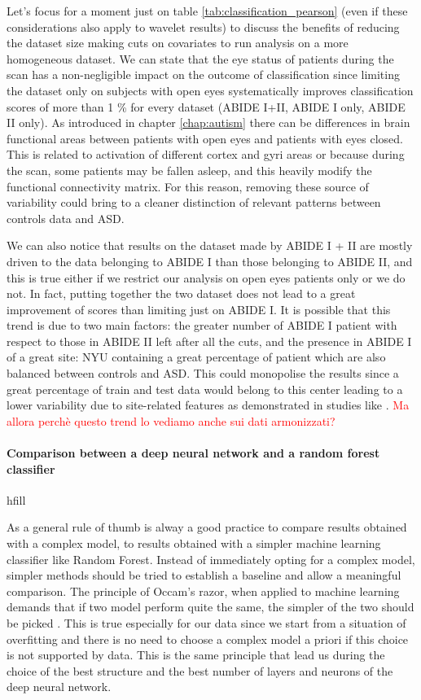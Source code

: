 \documentclass[11pt]{report}
\begin{document}
Let's focus for a moment just on table \ref{tab:classification_pearson} (even if these considerations also apply to wavelet results) to discuss the benefits of reducing the dataset size making cuts on covariates to run analysis on a more homogeneous dataset.
We can state that the eye status of patients during the scan has a non-negligible impact on the outcome of classification since limiting the dataset only on subjects with open eyes systematically improves classification scores of more than 1 \% for every dataset (ABIDE I+II, ABIDE I only, ABIDE II only).
As introduced in chapter \ref{chap:autism} there can be differences in brain functional areas between patients with open eyes and patients with eyes closed.
This is related to activation of different cortex and gyri areas or because during the scan, some patients may be fallen asleep, and this heavily modify the functional connectivity matrix.
For this reason, removing these source of variability could bring to a cleaner distinction of relevant patterns between controls data and ASD.

We can also notice that results on the dataset made by ABIDE I + II are mostly driven to the data belonging to ABIDE I than those belonging to ABIDE II, and this is true either if we restrict our analysis on open eyes patients only or we do not.
In fact, putting together the two dataset does not lead to a great improvement of scores than limiting just on ABIDE I.
It is possible that this trend is due to two main factors: the greater number of ABIDE I patient with respect to those in ABIDE II left after all the cuts, and the presence in ABIDE I of a great site: NYU containing a great percentage of patient which are also balanced between controls and ASD.
This could monopolise the results since a great percentage of train and test data would belong to this center leading to a lower variability due to site-related features as demonstrated in studies like \cite{spera-2019}.
\textcolor{red}{Ma allora perchè questo trend lo vediamo anche sui dati armonizzati?}


\paragraph{Comparison between a deep neural network and a random forest classifier}hfill

As a general rule of thumb is alway a good practice to compare results obtained with a complex model, to results obtained with a simpler machine learning classifier like Random Forest.
Instead of immediately opting for a complex model, simpler methods should be tried to establish a baseline and allow a meaningful comparison.
The principle of Occam's razor, when applied to machine learning demands that if two model perform quite the same, the simpler of the two should be picked \cite{domingos-1999}.
This is true especially for our data since we start from a situation of overfitting and there is no need to choose a complex model a priori if this choice is not supported by data.
This is the same principle that lead us during the choice of the best structure and the best number of layers and neurons of the deep neural network.
\end{document}
